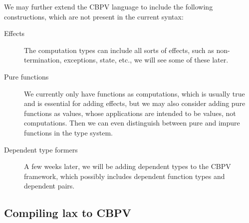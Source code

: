 \documentclass[letterpaper]{article}
\begin{document}
We may further extend the CBPV language to include the following constructions,
which are not present in the current syntax:

\begin{description}
  \item[Effects] The computation types can include all sorts of effects,
    such as non-termination, exceptions, state, etc., we will see some of these later.
  \item[Pure functions] We currently only have functions as computations,
    which is usually true and is essential for adding effects,
    but we may also consider adding pure functions as values,
    whose applications are intended to be values, not computations.
    Then we can even distinguish between pure and impure functions in the type system.
  \item[Dependent type formers] A few weeks later, we will be adding dependent types
    to the CBPV framework, which possibly includes dependent function types and dependent pairs.
\end{description}

\subsection{Compiling lax to CBPV}
\end{document}
